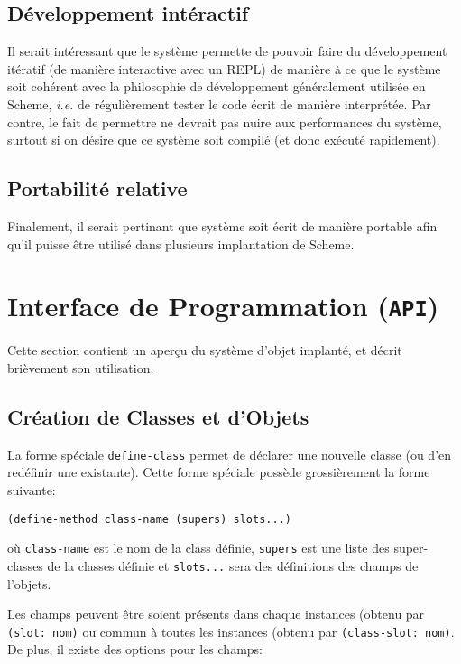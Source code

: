 \documentclass[letterpaper,12pt]{book}
\begin{document}
    \subsection{Développement intéractif}
      Il serait intéressant que le système permette de pouvoir faire
      du développement itératif (de manière interactive avec un REPL)
      de manière à ce que le système soit cohérent avec la philosophie
      de développement généralement utilisée en Scheme, \textit{i.e.}
      de régulièrement tester le code écrit de manière interprétée.
      Par contre, le fait de permettre ne devrait pas nuire aux
      performances du système, surtout si on désire que ce système
      soit compilé (et donc exécuté rapidement).

    \subsection{Portabilité relative}
      Finalement, il serait pertinant que système soit écrit de
      manière portable afin qu'il puisse être utilisé dans plusieurs
      implantation de Scheme. 


  \section{Interface de Programmation (\texttt{API})}
    \label{api}

    Cette section contient un aperçu du système d'objet implanté, et
    décrit brièvement son utilisation.
  
    \subsection{Création de Classes et d'Objets}
      La forme spéciale \texttt{define-class} permet de déclarer une
      nouvelle classe (ou d'en redéfinir une existante). Cette forme
      spéciale possède grossièrement la forme suivante:

      \begin{lstlisting}
(define-method class-name (supers) slots...)
      \end{lstlisting}

      où \texttt{class-name} est le nom de la class définie,
      \texttt{supers} est une liste des super-classes de la classes
      définie et \texttt{slots...} sera des définitions des champs de
      l'objets.

      Les champs peuvent être soient présents dans chaque instances
      (obtenu par \texttt{(slot: nom)} ou commun à toutes les
      instances (obtenu par \texttt{(class-slot: nom)}. De plus, il
      existe des options pour les champs:
      
\end{document}
